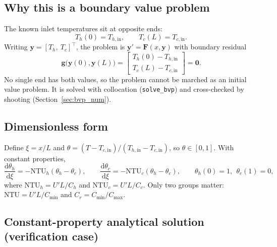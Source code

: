\documentclass[11pt]{article}
\newcommand{\dd}{\mathrm{d}}
\newcommand{\NTU}{\mathrm{NTU}}
\newcommand{\hin}{_{h,\mathrm{in}}}
\newcommand{\cin}{_{c,\mathrm{in}}}
\begin{document}
\subsection{Why this is a boundary value problem}

The known inlet temperatures sit at opposite ends:
\begin{equation}
  T_h(0) = T\hin, \qquad T_c(L) = T\cin.
  \label{eq:bc}
\end{equation}
Writing $\bm y = [T_h,\ T_c]^\top$, the problem is $\bm y' = \bm F(x,\bm y)$ with boundary residual
\begin{equation}
  \bm g\big(\bm y(0), \bm y(L)\big) =
  \begin{bmatrix} T_h(0) - T\hin \\ T_c(L) - T\cin \end{bmatrix} = \bm 0 .
\end{equation}
No single end has both values, so the problem cannot be marched as an initial value problem. It is solved with collocation (\texttt{solve\_bvp}) and cross-checked by shooting (Section~\ref{sec:bvp_num}).

\subsection{Dimensionless form}

Define $\xi = x/L$ and $\theta = (T - T\cin)/(T\hin - T\cin)$, so $\theta \in [0,1]$. With constant properties,
\begin{equation}
  \frac{\dd\theta_h}{\dd\xi} = -\NTU_h(\theta_h - \theta_c),
  \qquad
  \frac{\dd\theta_c}{\dd\xi} = -\NTU_c(\theta_h - \theta_c),
  \qquad
  \theta_h(0)=1,\ \ \theta_c(1)=0,
  \label{eq:dimless}
\end{equation}
where $\NTU_h = U'L/C_h$ and $\NTU_c = U'L/C_c$. Only two groups matter: $\NTU = U'L/C_{\min}$ and $C_r = C_{\min}/C_{\max}$.

\subsection{Constant-property analytical solution (verification case)}
\label{sec:analytic}
\end{document}
